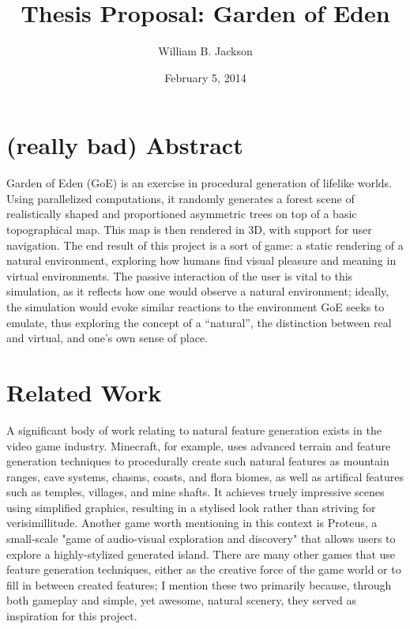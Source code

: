 \documentclass{article}
\title{Thesis Proposal: Garden of Eden}
\author{William B. Jackson}
\date{February 5, 2014}
\newcommand{\tab}{\hspace*{2em}}
\begin{document}
    \maketitle
    \section{(really bad) Abstract} %
    \tab Garden of Eden (GoE) is an exercise in procedural generation of lifelike worlds. Using
parallelized computations, it randomly generates a forest scene of realistically shaped and
proportioned asymmetric trees on top of a basic topographical map. This map is then rendered in 3D,
with support for user navigation. The end result of this project is a sort of game: a static
rendering of a natural environment, exploring how humans find visual pleasure and meaning in virtual
environments. The passive interaction of the user is vital to this simulation, as it reflects how
one would observe a natural environment; ideally, the simulation would evoke similar reactions to
the environment GoE seeks to emulate, thus exploring the concept of a “natural”, the distinction
between real and virtual, and one's own sense of place.
 

    \section{Related Work}
    \tab A significant body of work relating to natural feature generation exists in the video game
industry. Minecraft\cite{minecraft}, for example, uses advanced terrain and feature generation
techniques to procedurally create such natural features as mountain ranges, cave systems, chasms,
coasts, and flora biomes, as well as artifical features such as temples, villages, and mine shafts.
It achieves truely impressive scenes using simplified graphics, resulting in a stylised look rather
than striving for verisimillitude. Another game worth mentioning in this context is
Proteus\cite{proteus}, a small-scale "game of audio-visual exploration and discovery" that allows
users to explore a highly-stylized generated island. There are many other games that use feature
generation techniques, either as the creative force of the game world or to fill in between created
features; I mention these two primarily because, through both gameplay and simple, yet awesome,
natural scenery, they served as inspiration for this project.
\end{document}
